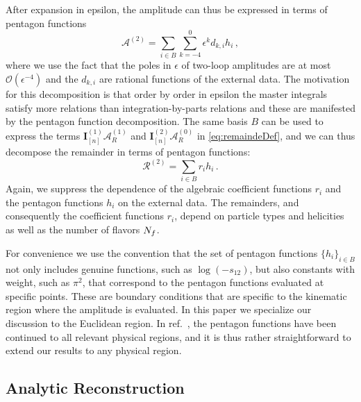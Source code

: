 After expansion in epsilon, the amplitude can thus be expressed in terms
of pentagon functions
\begin{equation}
  \mathcal{A}^{(2)}=
    \sum_{i\in B}\sum_{k=-4}^0\epsilon^{k}
    d_{k,i}h_i\,,
\end{equation}
where we use the fact that the poles in $\epsilon$
of two-loop amplitudes are at most $\mathcal{O}(\epsilon^{-4})$ and
the $d_{k,i}$ are rational functions of the external data.
 The motivation for this decomposition is
that order by order in epsilon the master integrals satisfy more
relations than integration-by-parts relations and these are manifested by the pentagon
function decomposition.
The same basis $B$ can be used to express the terms
$\mathbf{I}_{[n]}^{(1)}\mathcal{A}_R^{(1)}$
and $\mathbf{I}_{[n]}^{(2)}\mathcal{A}_R^{(0)}$ in \cref{eq:remaindeDef}, and we can thus decompose the remainder
in terms of pentagon functions:
\begin{equation}
  \mathcal{R}^{(2)} = \sum_{i \in B} r_i h_i\,.
  \label{eq:remainderPentagon}
\end{equation}
Again, we suppress the dependence of the 
algebraic coefficient functions $r_i$ and the pentagon functions $h_i$ on
the external data.
The remainders, and consequently the coefficient 
functions $r_i$, depend on particle types and helicities as well as
the number of flavors ${N_f}$.

For convenience we use the convention that the set of pentagon functions $\{h_i\}_{i\in B}$
not only includes genuine functions, such as $\log(-s_{12})$, but also
constants with weight, such as $\pi^2$, that correspond to the pentagon 
functions evaluated at specific points. These are boundary conditions that
are specific to the kinematic region where the amplitude is evaluated. In
this paper we specialize our discussion to the Euclidean region.
In  ref.~\cite{Gehrmann:2018yef}, the pentagon functions have been continued
to all relevant physical regions, and it is thus rather  straightforward
to extend our results to any physical region.

\subsection{Analytic Reconstruction}

